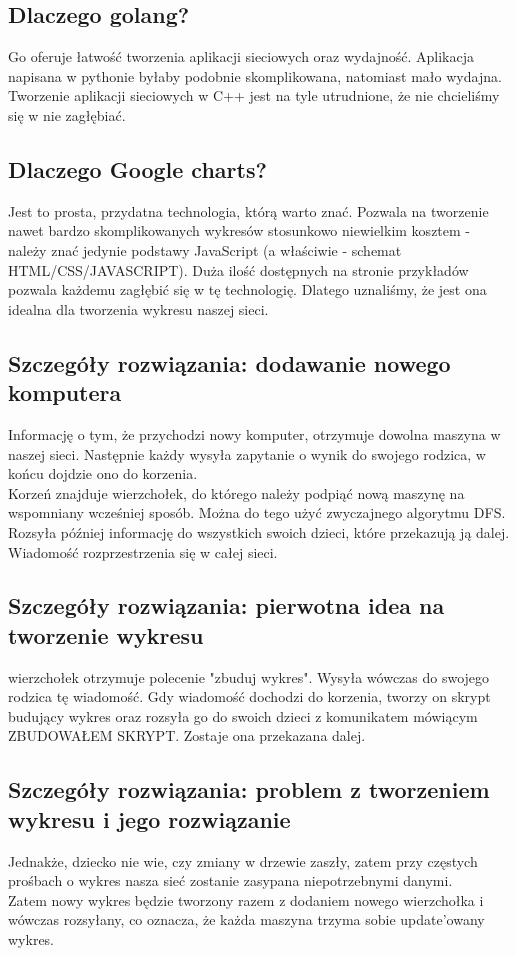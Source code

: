 \subsection{Dlaczego golang?}
Go oferuje łatwość tworzenia aplikacji sieciowych oraz wydajność. Aplikacja napisana w pythonie byłaby podobnie skomplikowana, natomiast mało wydajna. Tworzenie aplikacji sieciowych w C++ jest na tyle utrudnione, że nie chcieliśmy się w nie zagłębiać.

\subsection{Dlaczego Google charts?}
Jest to prosta, przydatna technologia, którą warto znać. Pozwala na tworzenie nawet bardzo skomplikowanych wykresów stosunkowo niewielkim kosztem - należy znać jedynie podstawy JavaScript (a właściwie - schemat HTML/CSS/JAVASCRIPT). Duża ilość dostępnych na stronie przykładów pozwala każdemu zagłębić się w tę technologię. Dlatego uznaliśmy, że jest ona idealna dla tworzenia wykresu naszej sieci.

\subsection{Szczegóły rozwiązania: dodawanie nowego komputera}
Informację o tym, że przychodzi nowy komputer, otrzymuje dowolna maszyna w naszej sieci. Następnie każdy wysyła zapytanie o wynik do swojego rodzica, w końcu dojdzie ono do korzenia.\\
Korzeń znajduje wierzchołek, do którego należy podpiąć nową maszynę na wspomniany wcześniej sposób. Można do tego użyć zwyczajnego algorytmu DFS.\\
Rozsyła później informację do wszystkich swoich dzieci, które przekazują ją dalej. Wiadomość rozprzestrzenia się w całej sieci.


\subsection{Szczegóły rozwiązania: pierwotna idea na tworzenie wykresu}
wierzchołek otrzymuje polecenie "zbuduj wykres". Wysyła wówczas do swojego rodzica tę wiadomość. Gdy wiadomość dochodzi do korzenia, tworzy on skrypt budujący wykres oraz rozsyła go do swoich dzieci z komunikatem mówiącym ZBUDOWAŁEM SKRYPT. Zostaje ona przekazana dalej.\\

\subsection{Szczegóły rozwiązania: problem z tworzeniem wykresu i jego rozwiązanie}
Jednakże, dziecko nie wie, czy zmiany w drzewie zaszły, zatem przy częstych prośbach o wykres nasza sieć zostanie zasypana niepotrzebnymi danymi.\\Zatem nowy wykres będzie tworzony razem z dodaniem nowego wierzchołka i wówczas rozsyłany, co oznacza, że każda maszyna trzyma sobie update'owany wykres.

